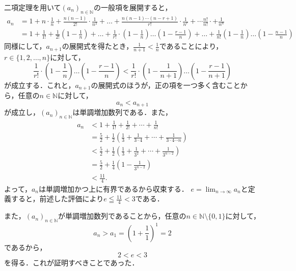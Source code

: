 \begin{tproof}
    二項定理を用いて$(a_n)_{n \in \mathbb{N}}$の一般項を展開すると，
    \begin{align*}
        a_n & =  1 + n \cdot \frac{1}{n} + \frac{n(n-1)}{2!} \cdot \frac{1}{n^2} + \dots + \frac{n(n-1)\cdots(n-r+1)}{r!} \cdot \frac{1}{n^r} + \cdots \frac{n!}{n!} \cdot + \frac{1}{n^n}                                                                              \\
            & = 1+ \frac{1}{1!} + \frac{1}{2!} \left(1- \frac{1}{n} \right) + \dots + \frac{1}{r!} \cdot  \left(1 - \frac{1}{n} \right) \dots \left (1-\frac{r-1}{n} \right) + \dots +  \frac{1}{n!} \left(1 - \frac{1}{n} \right) \dots \left(1- \frac{n-1}{n} \right)
    \end{align*}
    同様にして，$a_{n+1}$の展開式を得たとき，$ \frac{1}{n+1} < \frac{1}{n}$であることにより，$r\in \{ 1,2,\dots ,n\}$に対して，
    \[
        \frac{1}{r!} \cdot  \left(1 - \frac{1}{n} \right) \dots \left (1-\frac{r-1}{n} \right) < \frac{1}{r!} \cdot  \left(1 - \frac{1}{n+1} \right) \dots \left (1-\frac{r-1}{n+1} \right)
    \]
    が成立する．これと，$a_{n+1}$の展開式のほうが，正の項を一つ多く含むことから，任意の$n \in \mathbb{N}$に対して，
    \[
        a_{n} < a_{n+1}
    \]
    が成立し，$(a_n)_{n \in \mathbb{N}}$は単調増加数列である．また，
    \begin{align*}
        a_n
         & < 1 + \frac{1}{1!} + \frac{1}{2!} + \cdots + \frac{1}{n!}                                                         \\
         & = \frac{5}{2} + \frac{1}{2}\left(\frac{1}{3} + \frac{1}{3 \cdot 4} + \cdots + \frac{1}{3 \cdot 4 \cdots n}\right) \\
         & < \frac{5}{2} + \frac{1}{2}\left(\frac{1}{3} + \frac{1}{3^2} + \cdots + \frac{1}{3^{n-2}}\right)                  \\
         & = \frac{5}{2} + \frac{1}{4}\left(1 - \frac{1}{3^{n-2}}\right)                                                     \\
         & < \frac{11}{4}.
    \end{align*}
    よって，$a_n$は単調増加かつ上に有界であるから収束する．
    $e = \lim_{n \to \infty} a_n$と定義すると，前述した評価により$e \leqq \frac{11}{4} < 3$である．

    また，$(a_n)_{n \in \mathbb{N}}$が単調増加数列であることから，任意の$n \in \mathbb{N} \setminus \{0,1\}$に対して，
    \[
        a_n > a_1 = \left(1+\frac{1}{1}\right)^1 =2
    \]
    であるから，
    \[
        2<e<3
    \]
    を得る．これが証明すべきことであった．
\end{tproof}
\newpage


